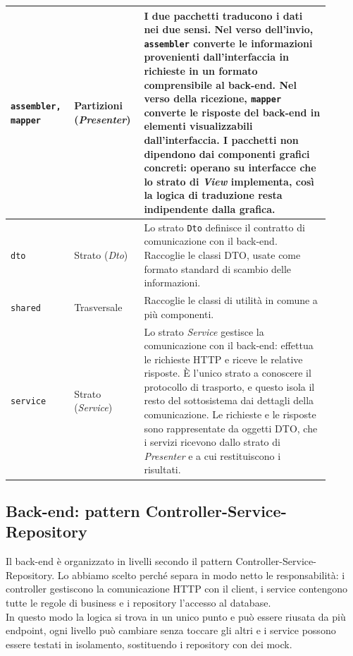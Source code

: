 \begin{center}
	\vspace*{-2em}
\def\arraystretch{2.0}
\begin{tabular}{|p{0.17\linewidth}|p{0.18\linewidth}|p{0.55\linewidth}|}
\texttt{assembler, mapper} & Partizioni (\textit{Presenter}) & I due pacchetti
traducono i dati nei due sensi. Nel verso dell’invio, \texttt{assembler} converte le 
informazioni provenienti dall’interfaccia in richieste in un formato 
comprensibile al back-end. Nel verso della ricezione, \texttt{mapper} converte le risposte 
del back-end in elementi visualizzabili dall’interfaccia. I pacchetti
non dipendono dai componenti grafici concreti: operano su interfacce che lo 
strato di \textit{View} implementa, così la logica di traduzione 
resta indipendente dalla grafica.\\
\hline
\texttt{dto} & Strato (\textit{Dto}) & Lo strato \texttt{Dto} definisce il contratto di comunicazione con il back-end. Raccoglie le classi DTO, usate come formato standard di scambio delle informazioni. \\
\hline
\texttt{shared} & Trasversale & 
Raccoglie le classi di utilità in comune a più componenti. \\
\hline
\texttt{service} & Strato (\textit{Service}) & Lo strato \textit{Service} gestisce la comunicazione con il back-end: effettua le richieste HTTP e riceve le relative risposte. È l’unico strato a conoscere il protocollo di trasporto, e questo isola il resto del sottosistema dai dettagli della comunicazione. Le richieste e le risposte sono rappresentate da oggetti DTO, che i servizi ricevono dallo strato di \textit{Presenter} e a cui restituiscono i risultati. \\
\hline
\end{tabular} 
\end{center} 

\vspace{1cm}

\subsection{Back-end: pattern Controller-Service-Repository}
Il back-end è organizzato in livelli secondo il pattern Controller-Service-Repository. 
Lo abbiamo scelto perché 
separa in modo netto le responsabilità: i controller gestiscono la comunicazione 
HTTP con il client, i service contengono tutte le regole di business e i 
repository l'accesso al database. \\
\indent In questo modo la logica si trova in un 
unico punto e può essere riusata da più endpoint, ogni livello può cambiare 
senza toccare gli altri e i service possono essere testati in isolamento, 
sostituendo i repository con dei mock.

